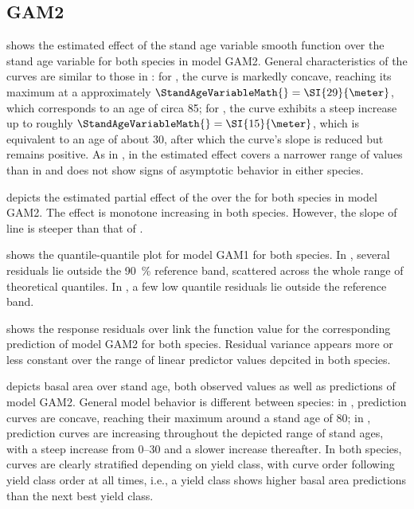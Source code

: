 \subsection{GAM2}

 shows the estimated effect of the stand age variable smooth function over the stand age variable for both species in model GAM2.  General characteristics of the curves are similar to those in :  for \Beech{}, the curve is markedly concave, reaching its maximum at a approximately \(\StandAgeVariableMath{} = \SI{29}{\meter}\), which corresponds to an age of circa \SI{85}{\year};  for \Spruce{}, the curve exhibits a steep increase up to roughly \(\StandAgeVariableMath{} = \SI{15}{\meter}\), which is equivalent to an age of about \SI{30}{\year}, after which the curve’s slope is reduced but remains positive.  As in , in \Beech{} the estimated effect covers a narrower range of values than in \Spruce{} and does not show signs of asymptotic behavior in either species.

 depicts the estimated partial effect of the \ProductivityIndexVariableText{} over the \ProductivityIndexVariableText{} for both species in model GAM2.  The effect is monotone increasing in both species.  However, the slope of \Beech{} line is steeper than that of \Spruce{}.

 shows the quantile-quantile plot for model GAM1 for both species.  In \Beech{}, several residuals lie outside the \SI{90}{\percent} reference band, scattered across the whole range of theoretical quantiles.  In \Spruce{}, a few  low quantile residuals lie outside the reference band.

 shows the response residuals over link the function value for the corresponding prediction of model GAM2 for both species.  Residual variance appears more or less constant over the range of linear predictor values depcited in both species.

 depicts basal area over stand age, both observed values as well as predictions of model GAM2.  General model behavior is different between species:  in \Beech{}, prediction curves are concave, reaching their maximum around a stand age of \SI{80}{\year};  in \Spruce{}, prediction curves are increasing throughout the depicted range of stand ages, with a steep increase from \SIrange{0}{30}{\year} and a slower increase thereafter.  In both species, curves are clearly stratified depending on yield class, with curve order following yield class order at all times, i.e., a yield class shows higher basal area predictions than the next best yield class.

